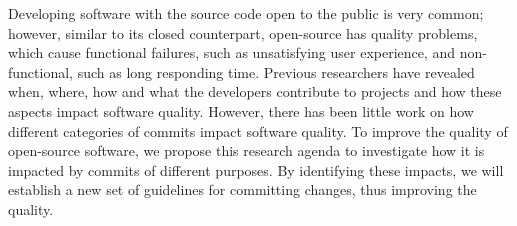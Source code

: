 Developing software with the source code open to the public is very common; however, similar to its closed counterpart, open-source has quality problems, which cause functional failures, such as unsatisfying user experience, and non-functional, such as long responding time.
Previous researchers have revealed when, where, how and what the developers contribute to projects and how these aspects impact software quality. 
However, there has been little work on how different categories of commits impact software quality.
To improve the quality of open-source software, we propose this research agenda to investigate how it is impacted by commits of different purposes.
By identifying these impacts, we will establish a new set of guidelines for committing changes, thus improving the quality.
